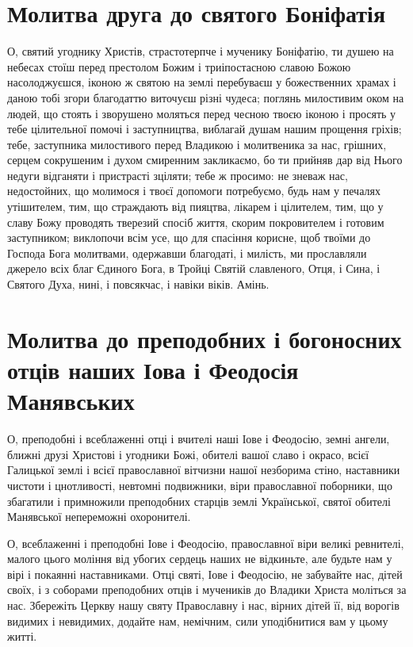 \documentclass[chapters.tex]{subfiles}
\begin{document}
\section{Молитва друга до святого Боніфатія}
О, святий угоднику Христів, страстотерпче і мученику Боніфатію, ти душею на небесах стоїш перед престолом Божим і триіпостасною славою Божою насолоджуєшся, іконою ж святою на землі перебуваєш у божественних храмах і даною тобі згори благодаттю виточуєш різні чудеса; поглянь милостивим оком на людей, що стоять і зворушено моляться перед чесною твоєю іконою і просять у тебе цілительної помочі і заступництва, виблагай душам нашим прощення гріхів; тебе, заступника милостивого перед Владикою і молитвеника за нас, грішних, серцем сокрушеним і духом смиренним закликаємо, бо ти прийняв дар від Нього недуги відганяти і пристрасті зціляти; тебе ж просимо: не зневаж нас, недостойних, що молимося і твоєї допомоги потребуємо, будь нам у печалях утішителем, тим, що страждають від пияцтва, лікарем і цілителем, тим, що у славу Божу проводять тверезий спосіб життя, скорим покровителем і готовим заступником; виклопочи всім усе, що для спасіння корисне, щоб твоїми до Господа Бога молитвами, одержавши благодаті, і милість, ми прославляли джерело всіх благ Єдиного Бога, в Тройці Святій славленого, Отця, і Сина, і Святого Духа, нині, і повсякчас, і навіки віків. Амінь.

\section{Молитва до преподобних і богоносних отців наших Іова і Феодосія Манявських}
О, преподобні і всеблаженні отці і вчителі наші Іове і Феодосію, земні ангели, ближні друзі Христові і угодники Божі, обителі вашої славо і окрасо, всієї Галицької землі і всієї православної вітчизни нашої незборима стіно, наставники чистоти і цнотливості, невтомні подвижники, віри православної поборники, що збагатили і примножили преподобних старців землі Української, святої обителі Манявської непереможні охоронителі.

О, всеблаженні і преподобні Іове і Феодосію, православної віри великі ревнителі, малого цього моління від убогих сердець наших не відкиньте, але будьте нам у вірі і покаянні наставниками. Отці святі, Іове і Феодосію, не забувайте нас, дітей своїх, і з соборами преподобних отців і мучеників до Владики Христа моліться за нас. Збережіть Церкву нашу святу Православну і нас, вірних дітей її, від ворогів видимих і невидимих, додайте нам, немічним, сили уподібнитися вам у цьому житті.
\end{document}
